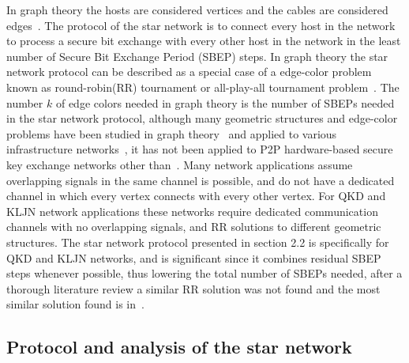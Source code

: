 \documentclass[a4paper,12pt,pdftex]{article}
\begin{document}
In graph theory the hosts are considered vertices and the cables are considered edges~\cite{introgt}. The protocol of the star network is to connect every host in the network to process a secure bit exchange with every other host in the network in the least number of Secure Bit Exchange Period (SBEP) steps. In graph theory the star network protocol can be described as a special case of a edge-color problem~\cite{edgecolor} known as round-robin(RR) tournament or all-play-all tournament problem~\cite{rrp}. The number $k$ of edge colors needed in graph theory is the number of SBEPs needed in the star network protocol, although many geometric structures and edge-color problems have been studied in graph theory~\cite{tutte1, tutte2, best, best2, book1, book2, book3} and applied to various infrastructure networks~\cite{apply1, apply2, apply3, book4}, it has not been applied to P2P hardware-based secure key exchange networks other than~\cite{me1}. Many network applications assume overlapping signals in the same channel is possible, and do not have a dedicated channel in which every vertex connects with every other vertex. For QKD and KLJN network applications these networks require dedicated communication channels with no overlapping signals, and RR solutions to different geometric structures. The star network protocol presented in section 2.2 is specifically for QKD and KLJN networks, and is significant since it combines residual SBEP steps whenever possible, thus lowering the total number of SBEPs needed, after a thorough literature review a similar RR solution was not found and the most similar solution found is in~\cite{best}.




\subsection{Protocol and analysis of the star network}
\end{document}
